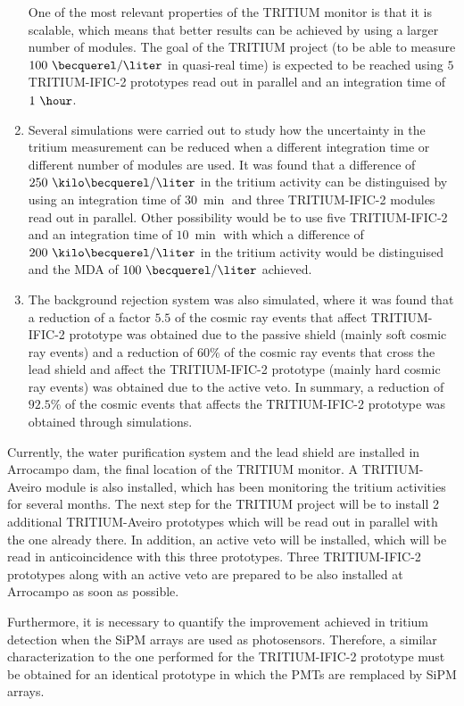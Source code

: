 \begin{enumerate}
One of the most relevant properties of the TRITIUM monitor is that it is scalable, which means that better results can be achieved by using a larger number of modules. The goal of the TRITIUM project (to be able to measure $100~\becquerel/\liter$ in quasi-real time) is expected to be reached using $5$ TRITIUM-IFIC-2 prototypes read out in parallel and an integration time of $1~\hour$.

\item{} Several simulations were carried out to study how the uncertainty in the tritium measurement can be reduced when a different integration time or different number of modules are used. It was found that a difference of $250~\kilo\becquerel/\liter$ in the tritium activity can be distinguised by using an integration time of $30~\min$ and three TRITIUM-IFIC-2 modules read out in parallel. Other possibility would be to use five TRITIUM-IFIC-2 and an integration time of $10~\min$ with which a difference of $200~\kilo\becquerel/\liter$ in the tritium activity would be distinguised and the MDA of $100~\becquerel/\liter$ achieved.

\item{} The background rejection system was also simulated, where it was found that a reduction of a factor $5.5$ of the cosmic ray events that affect TRITIUM-IFIC-2 prototype was obtained due to the passive shield (mainly soft cosmic ray events) and a reduction of $60\%$ of the cosmic ray events that cross the lead shield and affect the TRITIUM-IFIC-2 prototype (mainly hard cosmic ray events) was obtained due to the active veto. In summary, a reduction of $92.5\%$ of the cosmic events that affects the TRITIUM-IFIC-2 prototype was obtained through simulations.

\end{enumerate}

Currently, the water purification system and the lead shield are installed in Arrocampo dam, the final location of the TRITIUM monitor. A TRITIUM-Aveiro module is also installed, which has been monitoring the tritium activities for several months. The next step for the TRITIUM project will be to install 2 additional TRITIUM-Aveiro prototypes which will be read out in parallel with the one already there. In addition, an active veto will be installed, which will be read in anticoincidence with this three prototypes. Three TRITIUM-IFIC-2 prototypes along with an active veto are prepared to be also installed at Arrocampo as soon as possible.

Furthermore, it is necessary to quantify the improvement achieved in tritium detection when the SiPM arrays are used as photosensors. Therefore, a similar characterization to the one performed for the TRITIUM-IFIC-2 prototype must be obtained for an identical prototype in which the PMTs are remplaced by SiPM arrays.

